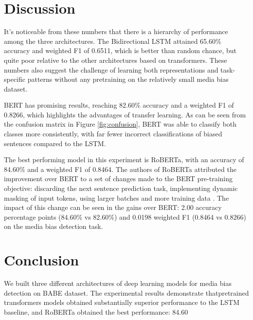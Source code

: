 \documentclass[a4paper,12pt]{report}
\begin{document}
\newpage

\section{Discussion}
It's noticeable from these numbers that there is a hierarchy of performance among the three architectures. The Bidirectional LSTM attained 65.60\% accuracy and weighted F1 of 0.6511, which is better than random chance, but quite poor relative to the other architectures based on transformers. These numbers also suggest the challenge of learning both representations and task-specific patterns without any pretraining on the relatively small media bias dataset.

BERT has promising results, reaching 82.60\% accuracy and a weighted F1 of 0.8266, which highlights the advantages of transfer learning. As can be seen from the confusion matrix in Figure \ref{fig:confusion}, BERT was able to classify both classes more consistently, with far fewer incorrect classifications of biased sentences compared to the LSTM.

The best performing model in this experiment is RoBERTa, with an accuracy of 84.60\% and a weighted F1 of 0.8464. The authors of RoBERTa attributed the improvement over BERT to a set of changes made to the BERT pre-training objective: discarding the next sentence prediction task, implementing dynamic masking of input tokens, using larger batches and more training data \cite{liu2019}. The impact of this change can be seen in the gains over BERT: 2.00 accuracy percentage points (84.60\% vs 82.60\%) and 0.0198 weighted F1 (0.8464 vs 0.8266) on the media bias detection task.
\newpage

\section{Conclusion}

We built three different architectures of deep learning models for media bias detection on BABE dataset. The experimental results demonstrate thatpretrained transformers models obtained substantially superior performance to the LSTM baseline, and RoBERTa obtained the best performance: 84.60%
\end{document}
